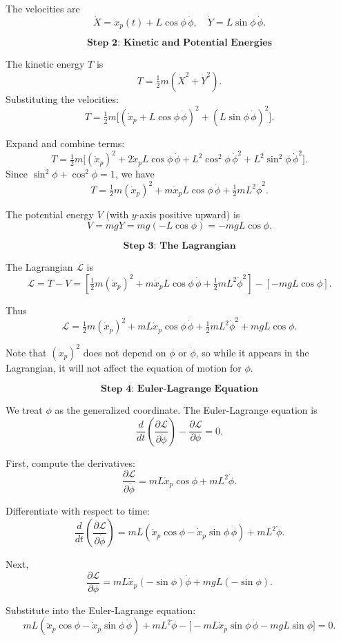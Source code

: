\documentclass{article}
\begin{document}
The velocities are
\[
\dot{X} = \dot{x}_p(t) + L\cos\phi\,\dot{\phi}, \quad \dot{Y} = L\sin\phi\,\dot{\phi}.
\]

\[
\textbf{Step 2: Kinetic and Potential Energies}
\]

The kinetic energy $T$ is
\[
T = \tfrac{1}{2}m(\dot{X}^2 + \dot{Y}^2).
\]
Substituting the velocities:
\[
T = \tfrac{1}{2}m\bigl[(\dot{x}_p + L\cos\phi\,\dot{\phi})^2 + (L\sin\phi\,\dot{\phi})^2\bigr].
\]

Expand and combine terms:
\[
T = \tfrac{1}{2}m\bigl[(\dot{x}_p)^2 + 2\dot{x}_p L\cos\phi\,\dot{\phi} + L^2\cos^2\phi\,\dot{\phi}^2 + L^2\sin^2\phi\,\dot{\phi}^2\bigr].
\]
Since $\sin^2\phi+\cos^2\phi=1$, we have
\[
T = \tfrac{1}{2}m(\dot{x}_p)^2 + m\dot{x}_p L\cos\phi\,\dot{\phi} + \tfrac{1}{2}mL^2\dot{\phi}^2.
\]

The potential energy $V$ (with $y$-axis positive upward) is
\[
V = mgY = mg(-L\cos\phi) = -mgL\cos\phi.
\]

\[
\textbf{Step 3: The Lagrangian}
\]

The Lagrangian $\mathcal{L}$ is
\[
\mathcal{L} = T - V = \left[\tfrac{1}{2}m(\dot{x}_p)^2 + m\dot{x}_p L\cos\phi\,\dot{\phi} + \tfrac{1}{2}mL^2\dot{\phi}^2\right] - [-mgL\cos\phi].
\]

Thus
\[
\mathcal{L} = \tfrac{1}{2}m(\dot{x}_p)^2 + mL\dot{x}_p\cos\phi\,\dot{\phi} + \tfrac{1}{2}mL^2\dot{\phi}^2 + mgL\cos\phi.
\]

Note that $(\dot{x}_p)^2$ does not depend on $\phi$ or $\dot{\phi}$, so while it appears in the Lagrangian, it will not affect the equation of motion for $\phi$.

\[
\textbf{Step 4: Euler-Lagrange Equation}
\]

We treat $\phi$ as the generalized coordinate. The Euler-Lagrange equation is
\[
\frac{d}{dt}\left(\frac{\partial\mathcal{L}}{\partial\dot{\phi}}\right) - \frac{\partial\mathcal{L}}{\partial\phi} = 0.
\]

First, compute the derivatives:
\[
\frac{\partial\mathcal{L}}{\partial\dot{\phi}} = mL\dot{x}_p\cos\phi + mL^2\dot{\phi}.
\]

Differentiate with respect to time:
\[
\frac{d}{dt}\left(\frac{\partial\mathcal{L}}{\partial\dot{\phi}}\right) = mL(\ddot{x}_p\cos\phi - \dot{x}_p\sin\phi\,\dot{\phi}) + mL^2\ddot{\phi}.
\]

Next,
\[
\frac{\partial\mathcal{L}}{\partial\phi} = mL\dot{x}_p(-\sin\phi)\dot{\phi} + mgL(-\sin\phi).
\]

Substitute into the Euler-Lagrange equation:
\[
mL(\ddot{x}_p\cos\phi - \dot{x}_p\sin\phi\,\dot{\phi}) + mL^2\ddot{\phi} - \bigl[-mL\dot{x}_p\sin\phi\,\dot{\phi} - mgL\sin\phi\bigr] = 0.
\]
\end{document}
